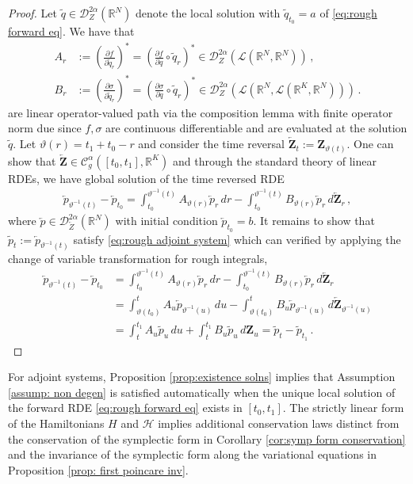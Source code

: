\documentclass[11pt, oneside]{article}
\numberwithin{equation}{section}
\theoremstyle{definition}
\newcommand{\cev}[1]{\overleftarrow{#1}}
\newcommand{\wt}[1]{\widetilde{#1}}
\newcommand{\mc}[1]{\mathcal{#1}}
\newcommand{\mcal}[1]{\mc{#1}}
\def\p{{\partial}}
\def\p{\partial}
\begin{document}
\begin{proof}
Let $\wt q \in \mcal{D}^{2\alpha}_Z(\mathbb{R}^N)$ denote the local solution with $\wt q_{t_0}=a$ of \eqref{eq:rough forward eq}. We have that 
\begin{align*}
    A_r &:=\left(\frac{\p f}{\p \wt{q}_r}\right)^* = \left(\frac{\p f}{\p q} \circ \wt{q}_r\right)^* \in \mcal{D}^{2\alpha}_Z(\mcal{L}(\mathbb R^N,\mathbb R^N))\,,\\
    B_r&:=\left(\frac{\p\sigma}{\p \wt{q}_r}\right)^* = \left(\frac{\p\sigma}{\p q} \circ \wt{q}_r\right)^* \in \mcal{D}^{2\alpha}_Z(\mcal{L}(\mathbb R^N,\mcal{L}(\mathbb R^K, \mathbb{R}^N)))\,.
\end{align*}
are linear operator-valued path via the composition lemma \cite[Lemma 7.3]{FH2020} with finite operator norm due since $f, \sigma $ are continuous differentiable and are evaluated at the solution $\wt{q}$. Let $\vartheta(r) = t_1 + t_0 - r$ and consider the time reversal $\cev{\mathbf{Z}}_t := \mathbf{Z}_{\vartheta(t)}$. One can show that $\cev{\mathbf{Z}} \in \mcal{C}^\alpha_g([t_0, t_1], \mathbb{R}^K)$ and through the standard theory of linear RDEs, we have global solution of the time reversed RDE
\begin{align*}
    \cev{p}_{\vartheta^{-1}(t)} - \cev{p}_{t_0} = \int^{\vartheta^{-1}(t)}_{t_0} A_{\vartheta(r)} \cev{p}_r \,dr - \int^{\vartheta^{-1}(t)}_{t_0} B_{\vartheta(r)} \cev{p}_r \,d\cev{\mathbf{Z}}_r\,,
\end{align*}
where $\cev{p} \in \mcal{D}^{2\alpha}_{\cev{Z}}(\mathbb{R}^N)$ with initial condition $\cev{p}_{t_0} = b$. It remains to show that $\wt{p}_t := \cev{p}_{\vartheta^{-1}(t)}$ satisfy \eqref{eq:rough adjoint system} which can verified by applying the change of variable transformation for rough integrals,
\begin{align*}
    \cev{p}_{\vartheta^{-1}(t)} - \cev{p}_{t_0} &= 
    \int^{\vartheta^{-1}(t)}_{t_0} A_{\vartheta(r)} \cev{p}_r \,dr - \int^{\vartheta^{-1}(t)}_{t_0} B_{\vartheta(r)} \cev{p}_r \,d\cev{\mathbf{Z}}_r \\
    &= \int^{t}_{\vartheta(t_0)} A_{u} \cev{p}_{\vartheta^{-1}(u)} \,du - \int^{t}_{\vartheta(t_0)} B_{u} \cev{p}_{\vartheta^{-1}(u)} \,d\cev{\mathbf{Z}}_{\vartheta^{-1}(u)} \\
    &= \int^{t_1}_{t} A_{u} \wt{p}_{u} \,du + \int^{t_1}_{t} B_{u} \wt{p}_{u} \,d\mathbf{Z}_{u}  = \wt{p}_{t} - \wt{p}_{t_1} \,.
\end{align*}
\end{proof}
For adjoint systems, Proposition \ref{prop:existence solns} implies that Assumption \ref{assump: non degen} is satisfied automatically when the unique local solution of the forward RDE \eqref{eq:rough forward eq} exists in $[t_0, t_1]$. The strictly linear form of the Hamiltonians $H$ and $\mcal{H}$ implies additional conservation laws distinct from the conservation of the symplectic form in Corollary \ref{cor:symp form conservation} and the invariance of the symplectic form along the variational equations in Proposition \ref{prop: first poincare inv}. 
\end{document}

